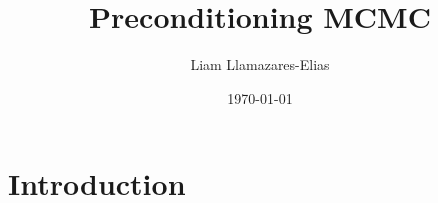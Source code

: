 \documentclass[
    a4paper,
    DIV=13,
    abstract=true,
    numbers=noenddot
]{scrartcl}
\begin{document}
\title{Preconditioning MCMC}
\author{Liam Llamazares-Elias}
\date{\today}
\maketitle
\section{Introduction}
\cite{agarwalIteratedSchrodingerBridge2024}
\cite[a]{sampsonNonparametricEstimationNonstationary1992,agarwalIteratedSchrodingerBridge2024,o.JohnNeumannCollected1964}
\printbibliography
\end{document}
